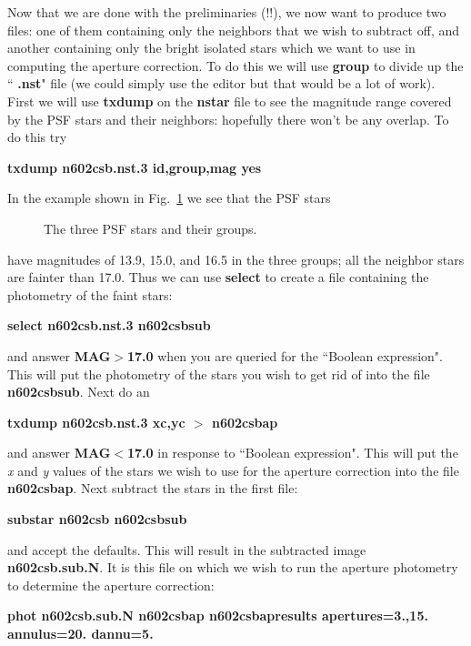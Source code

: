 Now that we are done with the preliminaries (!!),
we now want to produce two files: one of them containing only the
neighbors that we wish to subtract off, and another containing only the
bright isolated stars which we want to use in computing the aperture
correction.  To do this we will use {\bf group} to divide up the ``{\bf
.nst}" file (we could simply use the editor but that would be a lot of
work).  First we will use {\bf txdump} on the {\bf nstar} file to see the magnitude
range covered by the PSF stars and their neighbors: hopefully there
won't be any overlap.  To do this try
 
\centerline{ {\bf txdump n602csb.nst.3 id,group,mag yes} }
 
\noindent
In the example shown in Fig.~\ref{grouping} we see that the PSF stars
\begin{figure}
\vspace{2.0in}
\caption{\label{grouping} The three PSF stars and their groups.}
\end{figure}
have magnitudes of 13.9, 15.0, and 16.5 in the three groups; all the
neighbor stars are fainter than 17.0.  Thus we can use {\bf select} 
to create a file containing the
photometry of the faint stars:
 
\centerline{ {\bf select n602csb.nst.3 n602csbsub} }
 
\noindent 
and answer {\bf MAG$>$17.0} when you are queried for the ``Boolean
expression".  This will put the photometry of the stars you wish to get
rid of into the file {\bf n602csbsub}.  Next do an 
 
\centerline{ {\bf txdump n602csb.nst.3 xc,yc $>$ n602csbap} }
 
\noindent
and answer {\bf MAG$<$17.0} in response to ``Boolean expression".  This
will put the {\it x} and {\it y} values of the stars we wish to use for
the aperture correction into the file
{\bf n602csbap}.  Next subtract the stars in the first file:
 
\centerline{ {\bf substar n602csb n602csbsub} }
 
\noindent and accept the defaults.  This will result in the subtracted
image {\bf n602csb.sub.N}.  It is this file on which we wish to run
the aperture photometry to determine the aperture correction:
 
\centerline{ 
{\bf phot n602csb.sub.N n602csbap n602csbapresults apertures=3.,15. annulus=20. dannu=5.} }
 
